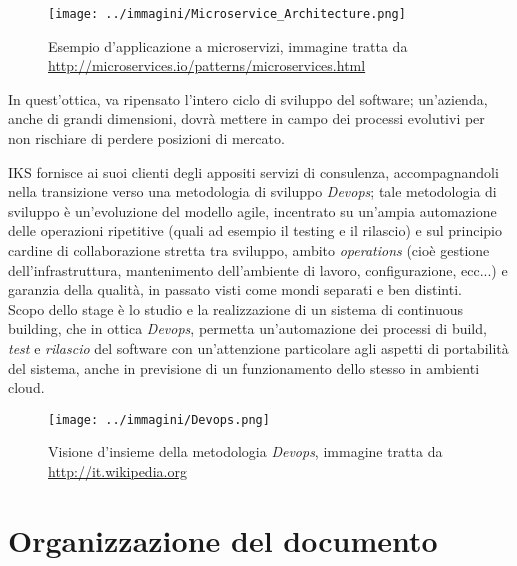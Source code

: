 \begin{figure}[H]
    \capstart
    \captionsetup{justification=centering}
    \centering
    \texttt{[image: ../immagini/Microservice\_Architecture.png]}
    \caption[Esempio d'applicazione a microservizi]{Esempio d'applicazione a microservizi, immagine tratta da \\ \url{http://microservices.io/patterns/microservices.html}}
\end{figure}

In quest'ottica, va ripensato l'intero ciclo di sviluppo del software; un'azienda, anche di grandi dimensioni, dovrà mettere in campo dei processi evolutivi per non rischiare di perdere posizioni di mercato. 

IKS fornisce ai suoi clienti degli appositi servizi di consulenza, accompagnandoli nella transizione verso una metodologia di sviluppo \textit{Devops}; tale metodologia di sviluppo è un'evoluzione del modello \gls{agile}, incentrato su un'ampia automazione delle operazioni ripetitive (quali ad esempio il testing e il rilascio) e sul principio cardine di collaborazione stretta tra sviluppo, ambito \textit{operations} (cioè gestione dell'infrastruttura, mantenimento dell'ambiente di lavoro, configurazione, ecc...) e garanzia della qualità, in passato visti come mondi separati e ben distinti. \\

Scopo dello stage è lo studio e la realizzazione di un sistema di \gls{continuous building}, che in ottica \textit{Devops}, permetta un'automazione dei processi di \gls{build}, \textit{test} e \textit{rilascio} del software con un'attenzione particolare agli aspetti di portabilità del sistema, anche in previsione di un funzionamento dello stesso in ambienti \gls{cloud}.

\begin{figure}[H]
    \capstart
    \centering
    \texttt{[image: ../immagini/Devops.png]}
    \caption[Visione d'insieme della metodologia \textit{Devops}]{Visione d'insieme della metodologia \textit{Devops}, immagine tratta da \\ \url{http://it.wikipedia.org}}
\end{figure}

\section{Organizzazione del documento}

